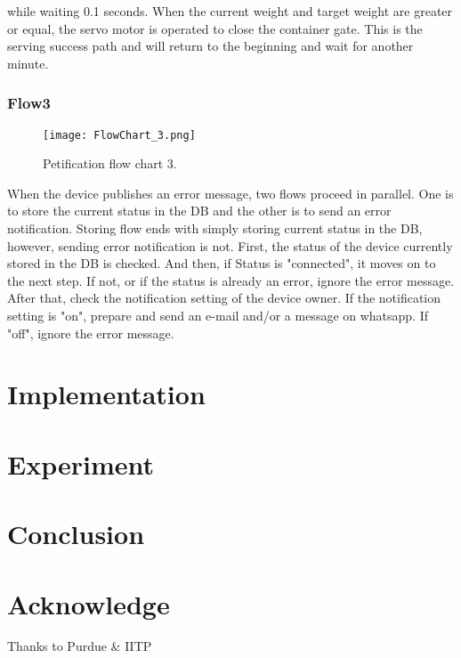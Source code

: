 \documentclass[conference]{IEEEtran}
\begin{document}
while waiting 0.1 seconds. When the current weight and target weight are greater or equal, the servo motor is operated to close the container gate. This is the serving success path and will return to the beginning and wait for another minute.

\hfill \break
\subsubsection{Flow3}
\begin{figure}[htbp]
\centerline{\texttt{[image: FlowChart\_3.png]}}
\caption{Petification flow chart 3.}
\label{fig}
\end{figure}
When the device publishes an error message, two flows proceed in parallel. One is to store the current status in the DB and the other is to send an error notification.
Storing flow ends with simply storing current status in the DB, however, sending error notification is not.
First, the status of the device currently stored in the DB is checked. And then, if Status is "connected", it moves on to the next step. If not, or if the status is already an error, ignore the error message. After that, check the notification setting of the device owner. If the notification setting is "on", prepare and send an e-mail and/or a message on whatsapp. If "off", ignore the error message. 






\section{Implementation}

\section{Experiment}
\section{Conclusion}

\section{Acknowledge}
Thanks to Purdue \& IITP
\end{document}
